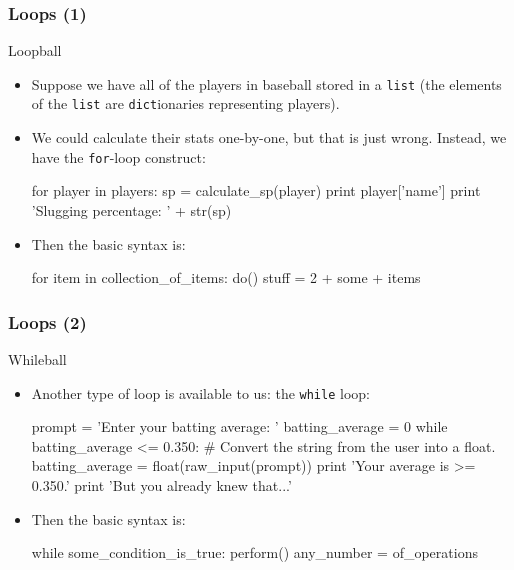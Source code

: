 \documentclass[10pt]{beamer}
\begin{document}
\begin{frame}[fragile]
  \frametitle{Loops (1)}
  \begin{block}{Loopball}
    \begin{itemize}
      \item Suppose we have all of the players in baseball stored in a \texttt{list} (the elements of the \texttt{list} are \texttt{dict}ionaries representing players).
      \item We could calculate their stats one-by-one, but that is just wrong.
        Instead, we have the \texttt{for}-loop construct:
        \begin{pythoncode}
  for player in players:
    sp = calculate_sp(player)
    print player['name']
    print 'Slugging percentage: ' + str(sp)
        \end{pythoncode}
      \item Then the basic syntax is:
      \begin{pythoncode}
  for item in collection_of_items:
    do()
    stuff = 2 + some + items
      \end{pythoncode}
    \end{itemize}
  \end{block}
\end{frame}

\begin{frame}[fragile]
  \frametitle{Loops (2)}
  \begin{block}{Whileball}
    \begin{itemize}
      \item Another type of loop is available to us: the \texttt{while} loop:
        \begin{pythoncode}
  prompt = 'Enter your batting average: '
  batting_average = 0
  while batting_average <= 0.350:
    # Convert the string from the user into a float.
    batting_average = float(raw_input(prompt))
  print 'Your average is >= 0.350.'
  print 'But you already knew that...'
        \end{pythoncode}
      \item Then the basic syntax is:
        \begin{pythoncode}
  while some_condition_is_true:
    perform()
    any_number = of_operations
        \end{pythoncode}
    \end{itemize}
  \end{block}
\end{frame}
\end{document}
